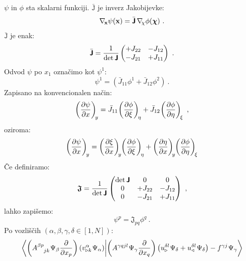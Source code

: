 $\psi$ in $\phi$ sta skalarni funkciji. $\bar{\texttt{J}}$ je inverz Jakobijevke:
\begin{equation}
   \mathbf{\nabla_{\mkern-3mu x}} \psi(\mathbf{x}) = \bar{\bm{\mathsf{J}}} \mkern3mu \mathbf{\nabla_{\mkern-4mu \chi}} \phi(\bm{\chi}) \ .
\end{equation}
$\bar{\texttt{J}}$ je enak:
\begin{equation}
   \bar{\bm{\mathsf{J}}}
   =
   \frac{1}{\det \bm{\mathsf{J}}}
   \begin{pmatrix}
      +J_{22} & -J_{12} \\
      -J_{21} & +J_{11}
   \end{pmatrix}
   \ .
\end{equation}
Odvod $\psi$ po $x_1$ označimo kot $\psi^1$:
\begin{equation}
   \psi^1 = \left(\bar{J}_{11} \phi^1 + \bar{J}_{12} \phi^2 \right) \ .
\end{equation}
Zapisano na konvencionalen način:
\begin{equation}
   \left(\frac{\partial \psi}{\partial x}\right)_{\mkern-4mu y}
   =
   \bar{J}_{11} \mkern-2mu \left(\frac{\partial \phi}{\partial \xi}\right)_{\mkern-3mu \eta}
   +
   \bar{J}_{12} \mkern-2mu \left(\frac{\partial \phi}{\partial \eta}\right)_{\mkern-3mu \xi} \ ,
\end{equation}
oziroma:
\begin{equation}
   \left(\frac{\partial \psi}{\partial x} \right)_{\mkern-3mu y}
   =
   \left(\frac{\partial \xi}{\partial x} \right)_{\mkern-4mu y}
   \mkern-4mu \left(\frac{\partial \phi}{\partial \xi}\right)_{\mkern-3mu \eta}
   +
   \left(\frac{\partial \eta}{\partial x}\right)_{\mkern-4mu y}
   \mkern-4mu \left(\frac{\partial \phi}{\partial \eta}\right)_{\mkern-3mu \xi}
\end{equation}
Če definiramo:
\begin{equation}
   \bm{\mathsf{\mathfrak{J}}}
   =
   \frac{1}{\det \bm{\mathsf{J}}}
   \begin{pmatrix}
      \det \bm{\mathsf{J}} & 0       & 0       \\
      0                & +J_{22} & -J_{12} \\
      0                & -J_{21} & +J_{11}
   \end{pmatrix} \ ,
\end{equation}
lahko zapišemo:
\begin{equation}
   \psi^p = \mathfrak{J}_{pq} \phi^{q} \ .
   \label{eq:refToEmt}
\end{equation}
Po vozliščih $(\alpha, \beta, \gamma, \delta \in [1,N])$:
\begin{equation}
   \bra{
      \left(A^{\beta p}_{\phantom{\beta p}jk} \mkern1mu \Psi_\beta \frac{\partial}{\partial x_p}\right)
      \left(v^\alpha_{\triangleright k} \mkern1mu \Psi_\alpha\right)}
   \ket{
      \left(A^{\gamma qjl} \mkern1mu \Psi_\gamma \frac{\partial}{\partial x_q}\right)
      \left(u^{\delta l}_\triangleright \mkern1mu \Psi_\delta + u^{\delta l}_\triangleleft \mkern1mu \Psi_\delta \right)
      -
      f^{\gamma j} \mkern1mu \Psi_\gamma }
\end{equation}
